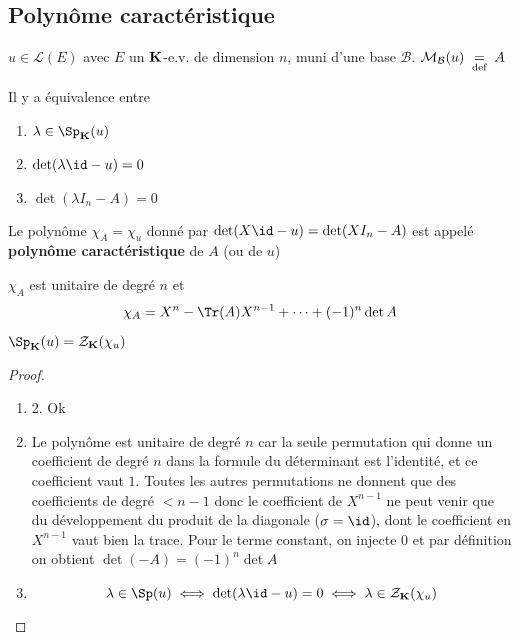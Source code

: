 \subsection{Polynôme caractéristique}


\begin{thmdef}
    \Hyp $u\in\mathcal L(E)$ avec $E$ un $\mathbf K$-e.v. de dimension $n$, muni d'une base $\mathcal B$. $\mathcal M_{\mathcal B}(u)\;\underset{\text{def}}=\; A$
    \begin{concenum}
        \item Il y a équivalence entre \begin{enumerate}
            \item $\lambda\in\Sp_{\K}(u)$
            \item $\det(\lambda\id-u)=0$
            \item $\det(\lambda I_n-A)=0$
        \end{enumerate}
        \item Le polynôme $\chi_A=\chi_u$ donné par $\det(X\id -u)=\det(X I_n-A)$ est appelé \textbf{polynôme caractéristique} de $A$ (ou de $u$)
        \item $\chi_A$ est unitaire de degré $n$ et \[
                \chi_A=X^n-\Tr (A) X^{n-1}+\cdots +(-1)^n\det A
            \]
        \item  $\Sp_{\K}(u)=\mathcal Z_{\K}(\chi_u)$
    \end{concenum}
\end{thmdef}

\begin{proof}
    \begin{enumerate}
        \item 2. Ok
        \setcounter{enumi}{2}
    \item Le polynôme est unitaire de degré $n$ car la seule permutation qui donne un coefficient de degré $n$ dans la formule du déterminant est l'identité, et ce coefficient vaut $1$. Toutes les autres permutations ne donnent que des coefficients de degré $<n-1$ donc le coefficient de $X^{n-1}$ ne peut venir que du développement du produit de la diagonale ($\sigma=\id$), dont le coefficient en $X^{n-1}$ vaut bien la trace. Pour le terme constant, on injecte $0$ et par définition on obtient $\det(-A)=(-1)^n\det A$
    \item \[
            \lambda\in\Sp(u)\iff \det(\lambda \id -u)=0\iff \lambda\in\mathcal Z_{\K}(\chi_u)
        \]
    \end{enumerate}
\end{proof}

